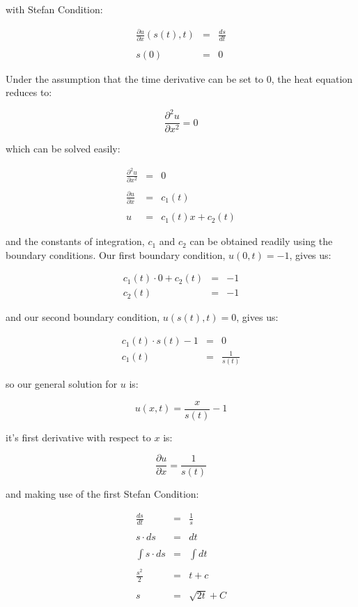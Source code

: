 \documentclass{report}
\begin{document}
with Stefan Condition:\bigskip

\begin{eqnarray*} 
  \frac{\partial u}{\partial x} (s(t), t) & = & \frac{d s}{d t} \\\\
                                       s(0) & = & 0 
\end{eqnarray*}\medskip

Under the assumption that the time derivative can be set to $0$, the heat equation reduces to:\bigskip

\[ \frac{\partial^2 u}{\partial x^2} = 0 \]\medskip

which can be solved easily:\bigskip

\begin{eqnarray*} 
  \frac{\partial^2 u}{\partial x^2} & = & 0 \\\\
      \frac{\partial u}{\partial x} & = & c_1(t) \\\\
                                  u & = & c_1(t) x + c_2(t) 
\end{eqnarray*}\medskip

and the constants of integration, $c_1$ and $c_2$ can be obtained readily using the boundary conditions. 
Our first boundary condition, $u(0, t) = -1$, gives us:\bigskip

\begin{eqnarray*} 
  c_1(t) \cdot 0 + c_2(t) & = & -1 \\
                   c_2(t) & = & -1
\end{eqnarray*}\medskip

and our second boundary condition, $u(s(t), t) = 0$, gives us:\bigskip

\begin{eqnarray*} 
  c_1(t) \cdot s(t) - 1 & = & 0 \\
                 c_1(t) & = & \frac{1}{s(t)}
\end{eqnarray*}\medskip

so our general solution for $u$ is:\bigskip

\[ u(x, t) = \frac{x}{s(t)} - 1 \]\medskip

it's first derivative with respect to $x$ is:\bigskip

\[ \frac{\partial u}{\partial x} = \frac{1}{s(t)} \]\medskip

and making use of the first Stefan Condition:\bigskip

\begin{eqnarray*} 
\frac{d s}{d t} & = & \frac{1}{s} \\\\
     s \cdot ds & = & dt \\\\
\int s \cdot ds & = & \int dt \\\\
  \frac{s^2}{2} & = & t + c \\\\
              s & = & \sqrt{2 t} + C
\end{eqnarray*}\medskip
\end{document}
